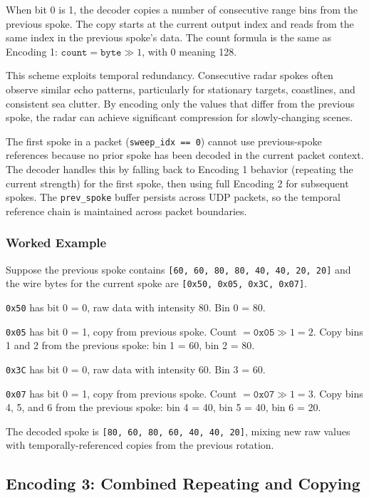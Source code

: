 \documentclass[11pt,letterpaper]{article}
\begin{document}
When bit 0 is 1, the decoder copies a number of consecutive range bins from the previous spoke. The copy starts at the current output index and reads from the same index in the previous spoke's data. The count formula is the same as Encoding 1: $\texttt{count} = \texttt{byte} \gg 1$, with 0 meaning 128.

This scheme exploits temporal redundancy. Consecutive radar spokes often observe similar echo patterns, particularly for stationary targets, coastlines, and consistent sea clutter. By encoding only the values that differ from the previous spoke, the radar can achieve significant compression for slowly-changing scenes.

The first spoke in a packet (\texttt{sweep\_idx == 0}) cannot use previous-spoke references because no prior spoke has been decoded in the current packet context. The decoder handles this by falling back to Encoding 1 behavior (repeating the current strength) for the first spoke, then using full Encoding 2 for subsequent spokes. The \texttt{prev\_spoke} buffer persists across UDP packets, so the temporal reference chain is maintained across packet boundaries.

\subsubsection{Worked Example}

Suppose the previous spoke contains \texttt{[60, 60, 80, 80, 40, 40, 20, 20]} and the wire bytes for the current spoke are \texttt{[0x50, 0x05, 0x3C, 0x07]}.

\texttt{0x50} has bit 0 = 0, raw data with intensity 80. Bin 0 = 80.

\texttt{0x05} has bit 0 = 1, copy from previous spoke. Count $= \texttt{0x05} \gg 1 = 2$. Copy bins 1 and 2 from the previous spoke: bin 1 = 60, bin 2 = 80.

\texttt{0x3C} has bit 0 = 0, raw data with intensity 60. Bin 3 = 60.

\texttt{0x07} has bit 0 = 1, copy from previous spoke. Count $= \texttt{0x07} \gg 1 = 3$. Copy bins 4, 5, and 6 from the previous spoke: bin 4 = 40, bin 5 = 40, bin 6 = 20.

The decoded spoke is \texttt{[80, 60, 80, 60, 40, 40, 20]}, mixing new raw values with temporally-referenced copies from the previous rotation.

\subsection{Encoding 3: Combined Repeating and Copying}
\label{subsec:enc3}
\end{document}
